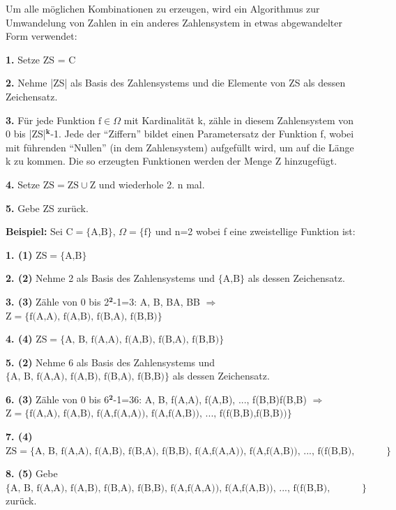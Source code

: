 Um alle möglichen Kombinationen zu erzeugen, wird ein Algorithmus zur Umwandelung von Zahlen in ein anderes Zahlensystem in etwas abgewandelter Form verwendet:
\begin{description}
\item \textbf{1.} Setze ZS = C
\item \textbf{2.} Nehme |ZS| als Basis des Zahlensystems und die Elemente von ZS als dessen Zeichensatz.
\item \textbf{3.} Für jede Funktion $\textrm{f}\in\Omega$ mit Kardinalität k, zähle in diesem Zahlensystem von 0 bis |ZS|$^{\textbf{k}}$-1. Jede der ``Ziffern'' bildet einen Parametersatz der Funktion f, wobei mit führenden ``Nullen'' (in dem Zahlensystem) aufgefüllt wird, um auf die Länge k zu kommen. Die so erzeugten Funktionen werden der Menge Z hinzugefügt.
\item \textbf{4.} Setze $\textrm{ZS}=\textrm{ZS}\cup\textrm{Z}$ und wiederhole 2. n mal.
\item \textbf{5.} Gebe ZS zurück.
\end{description}

\textbf{Beispiel:} Sei $\textrm{C}=\lbrace\textrm{A,B}\rbrace$, $\Omega=\lbrace\textrm{f}\rbrace$ und n=2 wobei f eine zweistellige Funktion ist:
\begin{description}
\item \textbf{1. (1)} $\textrm{ZS}=\lbrace\textrm{A,B}\rbrace$
\item \textbf{2. (2)} Nehme 2 als Basis des Zahlensystems und $\lbrace\textrm{A,B}\rbrace$ als dessen Zeichensatz.
\item \textbf{3. (3)} Zähle von 0 bis 2$^{\textbf{2}}$-1=3: A, B, BA, BB $\Rightarrow$ $\textrm{Z}=\lbrace\textrm{f(A,A), f(A,B), f(B,A), f(B,B)}\rbrace$
\item \textbf{4. (4)} $\textrm{ZS}=\lbrace\textrm{A, B, f(A,A), f(A,B), f(B,A), f(B,B)}\rbrace$
\item \textbf{5. (2)} Nehme 6 als Basis des Zahlensystems und $\lbrace\textrm{A, B, f(A,A), f(A,B), f(B,A), f(B,B)}\rbrace$ als dessen Zeichensatz.
\item \textbf{6. (3)} Zähle von 0 bis 6$^{\textbf{2}}$-1=36: A, B, f(A,A), f(A,B), ..., f(B,B)f(B,B) $\Rightarrow$ \\ $\textrm{Z}=\lbrace\textrm{f(A,A), f(A,B), f(A,f(A,A)), f(A,f(A,B)), ..., f(f(B,B),f(B,B))}\rbrace$
\item \textbf{7. (4)} $\textrm{ZS}=\lbrace\textrm{A, B, f(A,A), f(A,B), f(B,A), f(B,B), f(A,f(A,A)), f(A,f(A,B)), ..., f(f(B,B), f(B,B))}\rbrace$
\item \textbf{8. (5)} Gebe $\lbrace\textrm{A, B, f(A,A), f(A,B), f(B,A), f(B,B), f(A,f(A,A)), f(A,f(A,B)), ..., f(f(B,B), f(B,B))}\rbrace$ zurück.
\end{description}

